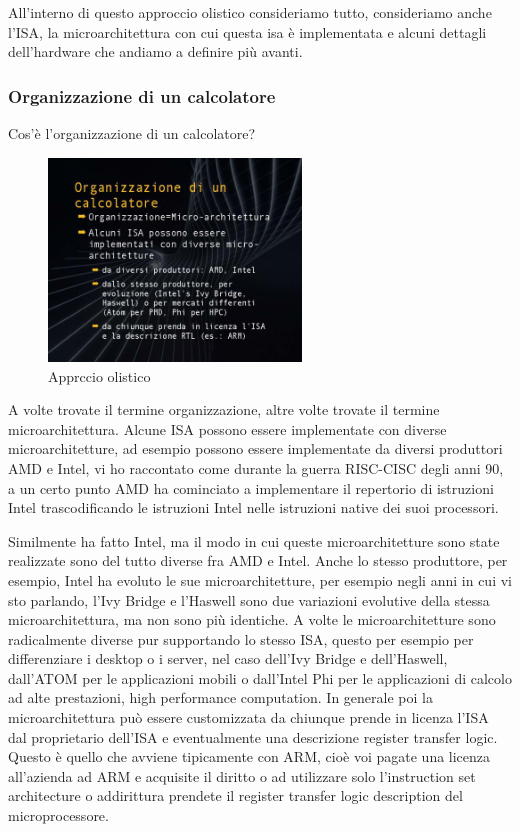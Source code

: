 All'interno di questo approccio olistico consideriamo tutto, consideriamo anche l'ISA, la microarchitettura con cui questa isa è implementata e alcuni dettagli dell'hardware che andiamo a definire più avanti.

\subsubsection{Organizzazione di un calcolatore}

Cos'è l'organizzazione di un calcolatore?

\FloatBarrier
\begin{figure}[H]
  \centering
  \includegraphics[width=0.6\textwidth,
                    trim=40 40 15 40, %
                    clip]{images/Lez02_p04_fig_04.png}
  \caption{Apprccio olistico}
  \label{fig:Lez02_p04_fig_04}
\end{figure}
\FloatBarrier
\noindent

A volte trovate il termine organizzazione, altre volte trovate il termine microarchitettura.
Alcune ISA possono essere implementate con diverse microarchitetture, ad esempio possono essere implementate da diversi produttori AMD e Intel, vi ho raccontato come durante la guerra RISC-CISC degli anni 90, a un certo punto AMD ha cominciato a implementare il repertorio di istruzioni Intel trascodificando le istruzioni Intel nelle istruzioni native dei suoi processori.

Similmente ha fatto Intel, ma il modo in cui queste microarchitetture sono state realizzate sono del tutto diverse fra AMD e Intel.
Anche lo stesso produttore, per esempio, Intel ha evoluto le sue microarchitetture, per esempio negli anni in cui vi sto parlando, l'Ivy Bridge e l'Haswell sono due variazioni evolutive della stessa microarchitettura, ma non sono più identiche.
A volte le microarchitetture sono radicalmente diverse pur supportando lo stesso ISA, questo per esempio per differenziare i desktop o i server, nel caso dell'Ivy Bridge e dell'Haswell, dall'ATOM per le applicazioni mobili o dall'Intel Phi per le applicazioni di calcolo ad alte prestazioni, high performance computation.
In generale poi la microarchitettura può essere customizzata da chiunque prende in licenza l'ISA dal proprietario dell'ISA e eventualmente una descrizione register transfer logic.
Questo è quello che avviene tipicamente con ARM, cioè voi pagate una licenza all'azienda ad ARM e acquisite il diritto o ad utilizzare solo l'instruction set architecture o addirittura prendete il register transfer logic description del microprocessore.

